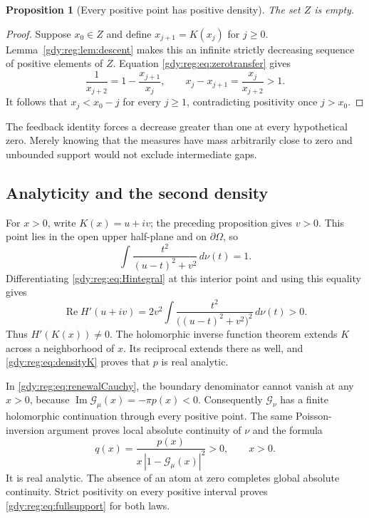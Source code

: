 \documentclass[11pt]{article}
\numberwithin{equation}{section}
\newtheorem{proposition}[theorem]{Proposition}
\theoremstyle{definition}
\theoremstyle{remark}
\DeclareMathOperator{\Rea}{Re}
\DeclareMathOperator{\Ima}{Im}
\begin{document}
\begin{proposition}[Every positive point has positive density]
\label{gdy:reg:prop:positive}
The set $Z$ is empty.
\end{proposition}
\begin{proof}
Suppose $x_0\in Z$ and define $x_{j+1}=K(x_j)$ for $j\ge0$.
Lemma~\ref{gdy:reg:lem:descent} makes this an infinite strictly decreasing
sequence of positive elements of $Z$.  Equation
\eqref{gdy:reg:eq:zerotransfer} gives
\[
 \frac1{x_{j+2}}=1-\frac{x_{j+1}}{x_j},\qquad
 x_j-x_{j+1}=\frac{x_j}{x_{j+2}}>1.
\]
It follows that $x_j<x_0-j$ for every $j\ge1$, contradicting positivity
once $j>x_0$.
\end{proof}

The feedback identity forces a decrease greater than one at every
hypothetical zero.  Merely knowing that the measures have mass
arbitrarily close to zero and unbounded support would not exclude
intermediate gaps.

\subsection{Analyticity and the second density}
\label{gdy:reg:subsec:analyticity}

For $x>0$, write $K(x)=u+iv$; the preceding proposition gives $v>0$.
This point lies in the open upper half-plane and on $\partial\Omega$,
so
\[
 \int\frac{t^2}{(u-t)^2+v^2}\,d\nu(t)=1.
\]
Differentiating \eqref{gdy:reg:eq:Hintegral} at this interior point and
using this equality gives
\begin{equation}\label{gdy:reg:eq:noncritical}
 \Rea H'(u+iv)
 =2v^2\int\frac{t^2}{\bigl((u-t)^2+v^2\bigr)^2}\,d\nu(t)>0.
\end{equation}
Thus $H'(K(x))\ne0$.  The holomorphic inverse function theorem extends
$K$ across a neighborhood of $x$.  Its reciprocal extends there as
well, and \eqref{gdy:reg:eq:densityK} proves that $p$ is real analytic.

In \eqref{gdy:reg:eq:renewalCauchy}, the boundary denominator cannot vanish
at any $x>0$, because
$\Ima \mathcal G_\mu(x)=-\pi p(x)<0$.
Consequently $\mathcal G_\nu$ has a finite holomorphic continuation
through every positive point.  The same Poisson-inversion argument
proves local absolute continuity of $\nu$ and the formula
\begin{equation}\label{gdy:reg:eq:densitybridge}
 q(x)=\frac{p(x)}{x\,|1-\mathcal G_\mu(x)|^2}>0,
 \qquad x>0.
\end{equation}
It is real analytic.  The absence of an atom at zero completes global
absolute continuity.  Strict positivity on every positive interval
proves \eqref{gdy:reg:eq:fullsupport} for both laws.
\end{document}
